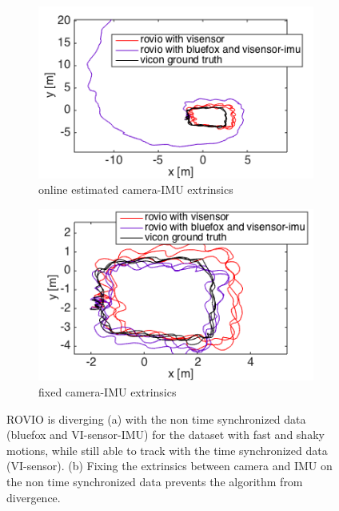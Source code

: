 \begin{figure}
  \begin{subfigure}[b]{0.48\textwidth}
    \captionsetup{skip=6pt}
    \includegraphics[width=\textwidth]{images/fast_2D.png}
    \caption{online estimated camera-IMU extrinsics}
  \end{subfigure}
  \hfill
  \begin{subfigure}[b]{0.48\textwidth}
    \captionsetup{skip=6pt}
    \includegraphics[width=\textwidth]{images/fast_fixed_2D.png}
    \caption{fixed camera-IMU extrinsics}
  \end{subfigure}
   \caption{ROVIO is diverging (a) with the non time synchronized data (bluefox and VI-sensor-IMU) for the dataset with fast and shaky motions, while still able to track with the time synchronized data (VI-sensor). (b) Fixing the extrinsics between camera and IMU on the non time synchronized data prevents the algorithm from divergence.}
   \label{pics:timesync_fast}
\end{figure}


